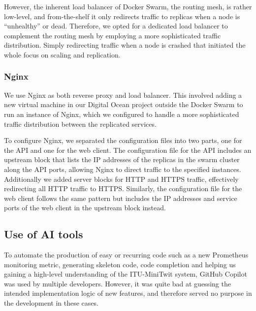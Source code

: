 However, the inherent load balancer of Docker Swarm, the routing mesh, is rather low-level, and from-the-shelf it only redirects traffic to replicas when a node is “unhealthy” or dead.
Therefore, we opted for a dedicated load balancer to complement the routing mesh by employing a more sophisticated traffic distribution. 
Simply redirecting traffic when a node is crashed  that initiated the whole focus on scaling and replication.

\subsubsection*{Nginx}
We use Nginx as both reverse proxy and load balancer. This involved adding a new virtual machine in our Digital Ocean project outside the Docker Swarm to run an instance of Nginx, which we configured to handle a more sophisticated traffic distribution between the replicated services.

To configure Nginx, we separated the configuration files into two parts, one for the API and one for the web client. The configuration file for the API includes an upstream block that lists the IP addresses of the replicas in the swarm cluster along the API ports, allowing Nginx to direct traffic to the specified instances. Additionally we added server blocks for HTTP and HTTPS traffic, effectively redirecting all HTTP traffic to HTTPS. Similarly, the configuration file for the web client follows the same pattern but includes the IP addresses and service ports of the web client in the upstream block instead. 


\subsection{Use of AI tools}
To automate the production of easy or recurring code such as a new Prometheus monitoring metric, generating skeleton code, code completion and helping us gaining a high-level understanding of the ITU-MiniTwit system, GitHub Copilot was used by multiple developers. 
However, it was quite bad at guessing the intended implementation logic of new features, and therefore served no purpose in the development in these cases.